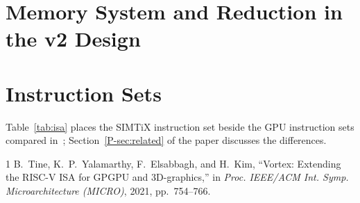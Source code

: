 \documentclass[journal]{IEEEtran}
\begin{document}


\section{Memory System and Reduction in the v2 Design}\label{sup:evalmem}


\section{Instruction Sets}\label{sup:isa}
Table~\ref{tab:isa} places the SIMTiX instruction set beside the GPU instruction sets
compared in~\cite{vortex}; Section~\ref{P-sec:related} of the paper discusses the
differences.



\begin{thebibliography}{1}
 B.~Tine, K.~P.~Yalamarthy, F.~Elsabbagh, and H.~Kim,
``Vortex: Extending the RISC-V ISA for GPGPU and 3D-graphics,'' in
\emph{Proc. IEEE/ACM Int. Symp. Microarchitecture (MICRO)}, 2021, pp.~754--766.
\end{thebibliography}
\end{document}
